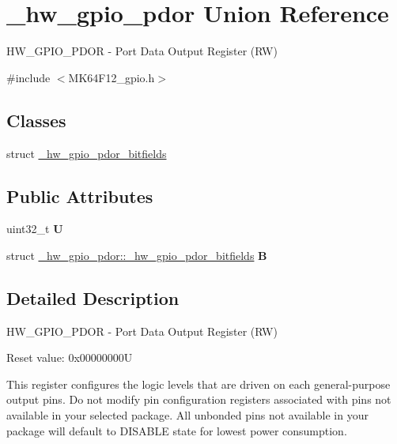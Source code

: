 \hypertarget{union__hw__gpio__pdor}{}\section{\+\_\+hw\+\_\+gpio\+\_\+pdor Union Reference}
\label{union__hw__gpio__pdor}


H\+W\+\_\+\+G\+P\+I\+O\+\_\+\+P\+D\+OR -\/ Port Data Output Register (RW)  




{\ttfamily \#include $<$M\+K64\+F12\+\_\+gpio.\+h$>$}

\subsection*{Classes}
\begin{DoxyCompactItemize}
\item 
struct \hyperlink{struct__hw__gpio__pdor_1_1__hw__gpio__pdor__bitfields}{\+\_\+hw\+\_\+gpio\+\_\+pdor\+\_\+bitfields}
\end{DoxyCompactItemize}
\subsection*{Public Attributes}
\begin{DoxyCompactItemize}
\item 
uint32\+\_\+t {\bfseries U}\hypertarget{union__hw__gpio__pdor_a2f808fe3480c996e71e074316f290e11}{}\label{union__hw__gpio__pdor_a2f808fe3480c996e71e074316f290e11}

\item 
struct \hyperlink{struct__hw__gpio__pdor_1_1__hw__gpio__pdor__bitfields}{\+\_\+hw\+\_\+gpio\+\_\+pdor\+::\+\_\+hw\+\_\+gpio\+\_\+pdor\+\_\+bitfields} {\bfseries B}\hypertarget{union__hw__gpio__pdor_acc9ef38b8034b34fbfcc5e0b79d984ba}{}\label{union__hw__gpio__pdor_acc9ef38b8034b34fbfcc5e0b79d984ba}

\end{DoxyCompactItemize}


\subsection{Detailed Description}
H\+W\+\_\+\+G\+P\+I\+O\+\_\+\+P\+D\+OR -\/ Port Data Output Register (RW) 

Reset value\+: 0x00000000U

This register configures the logic levels that are driven on each general-\/purpose output pins. Do not modify pin configuration registers associated with pins not available in your selected package. All unbonded pins not available in your package will default to D\+I\+S\+A\+B\+LE state for lowest power consumption. 

